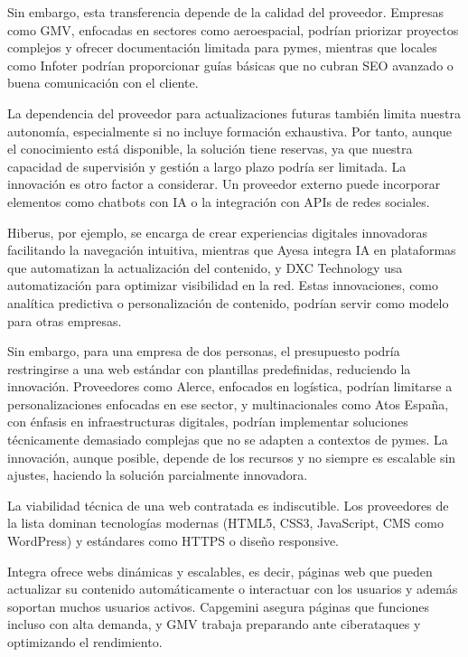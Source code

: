 \documentclass[11.5pt]{article}
\begin{document}
	Sin embargo, esta transferencia depende de la calidad del proveedor. Empresas como GMV, enfocadas en
	sectores como aeroespacial, podrían priorizar proyectos complejos y ofrecer documentación limitada para pymes, mientras que locales como Infoter podrían proporcionar guías básicas que no cubran SEO avanzado o
	buena comunicación con el cliente.
	
	La dependencia del proveedor para actualizaciones futuras también limita nuestra autonomía, especialmente
	si no incluye formación exhaustiva. Por tanto, aunque el conocimiento está disponible, la solución tiene
	reservas, ya que nuestra capacidad de supervisión y gestión a largo plazo podría ser limitada.
	La innovación es otro factor a considerar. Un proveedor externo puede incorporar elementos como chatbots
	con IA o la integración con APIs de redes sociales.
	
	Hiberus, por ejemplo, se encarga de crear experiencias digitales innovadoras facilitando la navegación
	intuitiva, mientras que Ayesa integra IA en plataformas que automatizan la actualización del contenido, y DXC
	Technology usa automatización para optimizar visibilidad en la red. Estas innovaciones, como analítica
	predictiva o personalización de contenido, podrían servir como modelo para otras empresas.
	
	Sin embargo, para una empresa de dos personas, el presupuesto podría restringirse a una web estándar con
	plantillas predefinidas, reduciendo la innovación. Proveedores como Alerce, enfocados en logística, podrían
	limitarse a personalizaciones enfocadas en ese sector, y multinacionales como Atos España, con énfasis en
	infraestructuras digitales, podrían implementar soluciones técnicamente demasiado complejas que no se
	adapten a contextos de pymes. La innovación, aunque posible, depende de los recursos y no siempre es
	escalable sin ajustes, haciendo la solución parcialmente innovadora.
	
	La viabilidad técnica de una web contratada es indiscutible. Los proveedores de la lista dominan tecnologías
	modernas (HTML5, CSS3, JavaScript, CMS como WordPress) y estándares como HTTPS o diseño
	responsive.
	
	Integra ofrece webs dinámicas y escalables, es decir, páginas web que pueden actualizar su contenido
	automáticamente o interactuar con los usuarios y además soportan muchos usuarios activos. Capgemini
	asegura páginas que funciones incluso con alta demanda, y GMV trabaja preparando ante ciberataques y
	optimizando el rendimiento.
	
\end{document}
